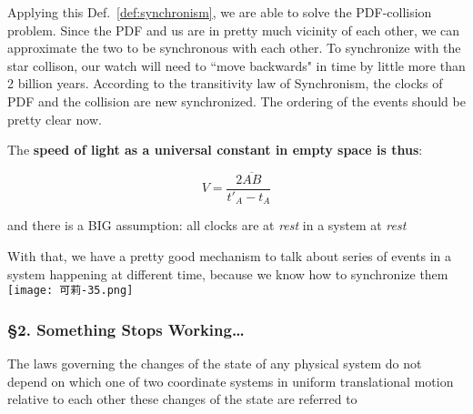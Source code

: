 Applying this Def.~\ref{def:synchronism}, we are able to solve the PDF-collision problem. Since the PDF and us are in
pretty much vicinity of each other, we can approximate the two to be synchronous with each other. To synchronize with
the star collison, our watch will need to ``move backwards" in time by little more than 2 billion years. According to
the transitivity law of Synchronism, the clocks of PDF and the collision are new synchronized. The ordering of the
events should be pretty clear now.

The \textbf{speed of light as a universal constant in empty space is thus}:

\begin{tcolorbox}[enhanced,colframe=green!75!black,colback=green!5!white]
    \begin{equation}
        V = \frac{2\overline{AB}}{t'_A - t_A}
    \end{equation}
\end{tcolorbox}

\begin{marker}
    and there is a BIG assumption: all clocks are at \textit{rest} in a system at \textit{rest}
\end{marker}

With that, we have a pretty good mechanism to talk about series of events in a system happening at different time,
because we know how to synchronize them \texttt{[image: 可莉-35.png]}

\subsubsection{\hfil \S2. Something Stops Working\ldots \hfil}

\begin{tcolorbox}[
    enhanced,
    title=Principle of Relativity,
    colframe=green!50!black,
    colback=green!10!white,
    arc=0mm,
    colbacktitle=red!10!white,
    coltitle=green!50!black,
    attach boxed title to top text right={yshift=-0.50mm},
    boxed title style={
        skin=enhancedfirst jigsaw,
        size=small,arc=1mm,bottom=-1mm,
        interior style={fill=none, top color=green!30!white, bottom color=green!20!white}
    }
]
    The laws governing the changes of the state of any physical system do not depend on which one of two coordinate
    systems in uniform translational motion relative to each other these changes of the state are referred to
\end{tcolorbox}

